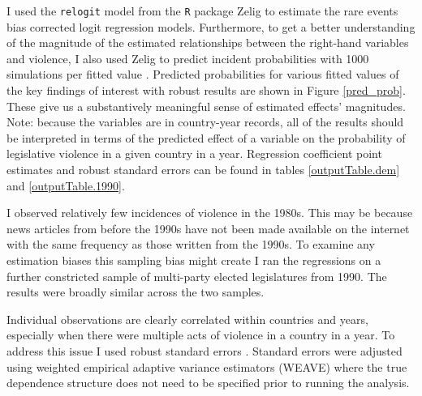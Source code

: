 \documentclass[a4paper]{article}\usepackage[]{graphicx}\usepackage[]{color}
\begin{document}
I used the {\tt{relogit}} model from the {\tt{R}} package Zelig \citep{IMAIKingZelig2008} to estimate the rare events bias corrected logit regression models. Furthermore, to get a better understanding of the magnitude of the estimated relationships between the right-hand variables and violence, I also used Zelig to predict incident probabilities with 1000 simulations per fitted value \citep[see][]{King2002}. Predicted probabilities for various fitted values of the key findings of interest with robust results are shown in Figure \ref{pred_prob}. These give us a substantively meaningful sense of estimated effects' magnitudes. Note: because the variables are in country-year records, all of the results should be interpreted in terms of the predicted effect of a variable on the probability of legislative violence in a given country in a year. Regression coefficient point estimates and robust standard errors can be found in tables \ref{outputTable.dem} and \ref{outputTable.1990}.

I observed relatively few incidences of violence in the 1980s. This may be because news articles from before the 1990s have not been made available on the internet with the same frequency as those written from the 1990s. To examine any estimation biases this sampling bias might create I ran the regressions on a further constricted sample of multi-party elected legislatures from 1990. The results were broadly similar across the two samples. 

Individual observations are clearly correlated within countries and years, especially when there were multiple acts of violence in a country in a year. To address this issue I used robust standard errors \citep{Golder2006, Mainwaring2007}. Standard errors were adjusted using \cite{Lumley1999} weighted empirical adaptive variance estimators (WEAVE) where the true dependence structure does not need to be specified prior to running the analysis. 
\end{document}
